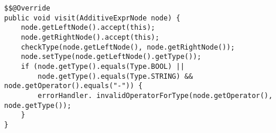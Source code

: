 \begin{lstlisting}[caption={Visit additive expression node in type checker}, label={code:TC:Additive}]
$$@Override
public void visit(AdditiveExprNode node) {
    node.getLeftNode().accept(this);
    node.getRightNode().accept(this);
    checkType(node.getLeftNode(), node.getRightNode());
    node.setType(node.getLeftNode().getType());
    if (node.getType().equals(Type.BOOL) ||
        node.getType().equals(Type.STRING) && node.getOperator().equals("-")) {
        errorHandler. invalidOperatorForType(node.getOperator(), node.getType());
    }
}
\end{lstlisting}